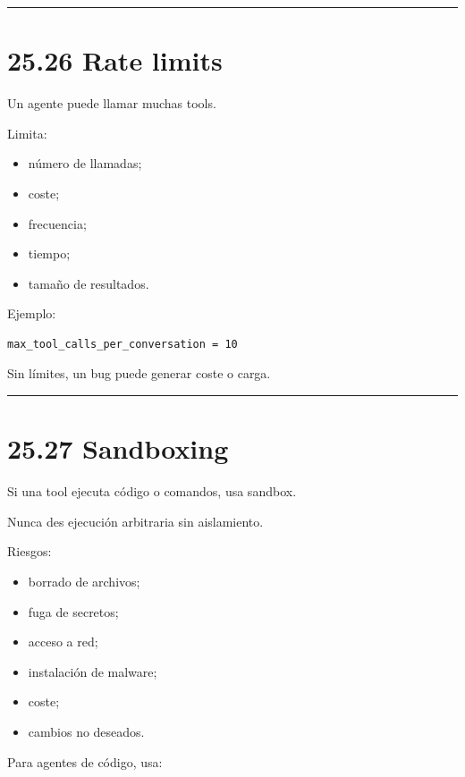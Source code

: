 \begin{center}\rule{0.5\linewidth}{0.5pt}\end{center}

\section{25.26 Rate limits}\label{rate-limits}

Un agente puede llamar muchas tools.

Limita:

\begin{itemize}
\tightlist
\item
  número de llamadas;
\item
  coste;
\item
  frecuencia;
\item
  tiempo;
\item
  tamaño de resultados.
\end{itemize}

Ejemplo:

\begin{lstlisting}
max_tool_calls_per_conversation = 10
\end{lstlisting}

Sin límites, un bug puede generar coste o carga.

\begin{center}\rule{0.5\linewidth}{0.5pt}\end{center}

\section{25.27 Sandboxing}\label{sandboxing}

Si una tool ejecuta código o comandos, usa sandbox.

Nunca des ejecución arbitraria sin aislamiento.

Riesgos:

\begin{itemize}
\tightlist
\item
  borrado de archivos;
\item
  fuga de secretos;
\item
  acceso a red;
\item
  instalación de malware;
\item
  coste;
\item
  cambios no deseados.
\end{itemize}

Para agentes de código, usa:

